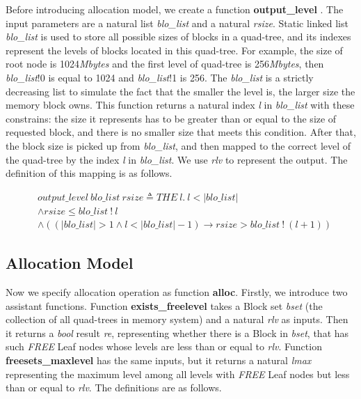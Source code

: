 Before introducing allocation model, we create a function \textbf{output\_level} . The input parameters are a natural list \emph{blo\_list} and a natural \emph{rsize}. Static linked list \emph{blo\_list} is used to store all possible sizes of blocks in a quad-tree, and its indexes represent the levels of blocks located in this quad-tree. For example, the size of root node is 1024\emph{Mbytes} and the first level of quad-tree is 256\emph{Mbytes}, then \emph{blo\_list}!0 is equal to 1024 and \emph{blo\_list}!1 is 256. The \emph{blo\_list} is a strictly decreasing list to simulate the fact that the smaller the level is, the larger size the memory block owns. This function returns a natural index \emph{l} in \emph{blo\_list} with these constrains: the size it represents has to be greater than or equal to the size of requested block, and there is no smaller size that meets this condition. After that, the block size is picked up from \emph{blo\_list}, and then mapped to the correct level of the quad-tree by the index \emph{l} in \emph{blo\_list}. We use \emph{rlv} to represent the output. The definition of this mapping is as follows.

\begin{definition} 
\label{mostsuitable}
\end{definition}
{\footnotesize
\begin{align*}
&output\_level\ blo\_list\ rsize \triangleq THE\ l.\ l < \vert blo\_list \vert \\
&\wedge rsize \le blo\_list\ !\ l \\
&\wedge ((\vert blo\_list \vert > 1 \wedge l < \vert blo\_list \vert - 1) \longrightarrow rsize > blo\_list\ !\ (l+1))
\end{align*}
}

\subsection{Allocation Model}
Now we specify allocation operation as function \textbf{alloc}. Firstly, we introduce two assistant functions. Function \textbf{exists\_freelevel} takes a Block set \emph{bset} (the collection of all quad-trees in memory system) and a natural \emph{rlv} as inputs. Then it returns a \emph{bool} result \emph{re}, representing whether there is a Block in \emph{bset}, that has such \emph{FREE} Leaf nodes whose levels are less than or equal to \emph{rlv}. Function \textbf{freesets\_maxlevel} has the same inputs, but it returns a natural \emph{lmax} representing the maximum level among all levels with \emph{FREE} Leaf nodes but less than or equal to \emph{rlv}. The definitions are as follows.

